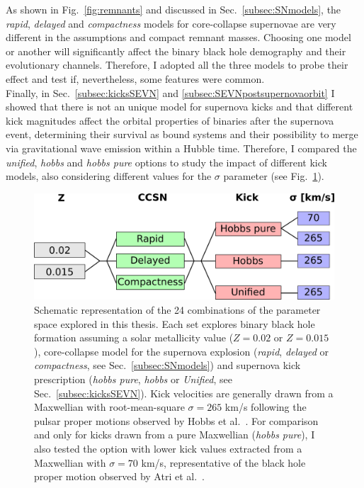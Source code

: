\documentclass[a4paper,titlepage]{book}     	%
\begin{document}
As shown in Fig.\ \ref{fig:remnants} and discussed in Sec.\ \ref{subsec:SNmodels}, the \emph{rapid}, \emph{delayed} and \emph{compactness} models for core-collapse supernovae are very different in the assumptions and compact remnant masses. Choosing one model or another will  significantly affect the binary black hole demography and their evolutionary channels. Therefore, I adopted all the three models to probe their effect and test if, nevertheless, some features were common.\\

Finally, in Sec.\ \ref{subsec:kicksSEVN} and \ref{subsec:SEVNpostsupernovaorbit} I showed that there is not an unique model for supernova kicks and that different kick magnitudes affect the orbital properties of binaries after the supernova event, determining their survival as bound systems and their possibility to merge via gravitational wave emission within a Hubble time. Therefore, I compared the \emph{unified}, \emph{hobbs} and \emph{hobbs pure} options to study the impact of different kick models, also considering different values for the $\sigma$ parameter (see Fig.~\ref{fig:parameterspace}). %




\begin{figure}
	\centering
	\includegraphics[width=.95\textwidth]{./images/parameterspace.png}	
	\caption{Schematic representation of the 24 combinations of the parameter space explored in this thesis. Each set explores binary black hole formation assuming a solar metallicity value ($Z=0.02$ or $Z=0.015$), core-collapse model for the supernova explosion (\emph{rapid}, \emph{delayed} or \emph{compactness}, see Sec.\ \ref{subsec:SNmodels}) and supernova kick prescription (\emph{hobbs pure}, \emph{hobbs} or \emph{Unified}, see Sec.\ \ref{subsec:kicksSEVN}). Kick velocities are generally drawn from a Maxwellian with root-mean-square $\sigma = 265$ km/s following the pulsar proper motions observed by Hobbs et al.\ \cite{Hobbs2005}. For comparison and only for kicks drawn from a pure Maxwellian (\emph{hobbs pure}), I also tested the option with lower kick values extracted from a Maxwellian with $\sigma = 70$ km/s,  representative of the black hole proper motion observed by Atri et al.\ \cite{Atri2019_kicks}.}\label{fig:parameterspace}
\end{figure}
\end{document}
